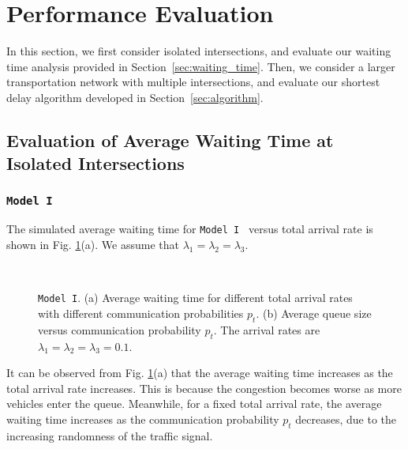 \documentclass[conference]{IEEEtran}
\newcommand{\modelI}{{\tt{Model I}}}
\begin{document}
\vspace{-5pt}
\section{Performance Evaluation}\label{sec:sims}
In this section, we first consider isolated intersections, and evaluate our waiting time analysis provided in Section~\ref{sec:waiting_time}. Then, we consider a larger transportation network with multiple intersections, and evaluate our shortest delay algorithm developed in Section~\ref{sec:algorithm}.

\vspace{-5pt}
\subsection{Evaluation of Average Waiting Time at Isolated Intersections}

\subsubsection{\modelI}
The simulated average waiting time for \modelI~ versus total arrival rate is shown in Fig. \ref{fig:sims_one_queue_modelI}(a). We assume that $\lambda_1=\lambda_2=\lambda_3$.


\begin{figure}[t!]
\vspace{-10pt}
\begin{center}
 \\
\end{center}
\begin{center}
\vspace{-5pt}
\caption{\label{fig:sims_one_queue_modelI} \modelI. (a) Average waiting time for different total arrival rates with different communication probabilities $p_t$. (b) Average queue size versus communication probability $p_t$. The arrival rates are $\lambda_1=\lambda_2=\lambda_3=0.1$.}
\vspace{-25pt}
\end{center}
\end{figure}




It can be observed from Fig. \ref{fig:sims_one_queue_modelI}(a) that the average waiting time increases as the total arrival rate increases. This is because the congestion becomes worse as more vehicles enter the queue. Meanwhile, for a fixed total arrival rate, the average waiting time increases as the communication probability $p_t$ decreases, due to the increasing randomness of the traffic signal.
\end{document}
